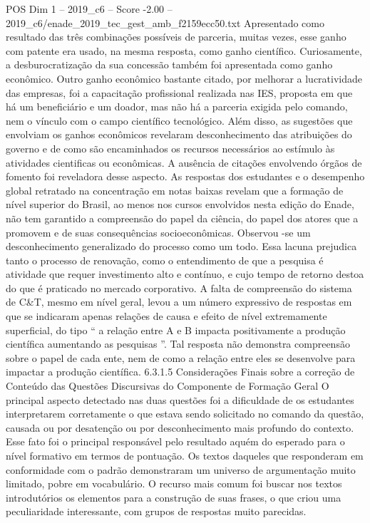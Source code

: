 \begin{textsample}{POS Dim 1 – 2019\_c6 – Score -2.00 – 2019\_c6/enade\_2019\_tec\_gest\_amb\_f2159ecc50.txt}
Apresentado como resultado das três combinações possíveis de parceria, muitas vezes, esse ganho com patente era usado, na mesma resposta, como ganho científico.
Curiosamente, a desburocratização da sua concessão também foi apresentada como ganho econômico.
Outro ganho econômico bastante citado, por melhorar a lucratividade das empresas, foi a capacitação profissional realizada nas IES, proposta em que há um beneficiário e um doador, mas não há a parceria exigida pelo comando, nem o vínculo com o campo científico tecnológico.
Além disso, as sugestões que envolviam os ganhos econômicos revelaram desconhecimento das atribuições do governo e de como são encaminhados os recursos necessários ao estímulo às atividades cientificas ou econômicas.
A ausência de citações envolvendo órgãos de fomento foi reveladora desse aspecto.
As respostas dos estudantes e o desempenho global retratado na concentração em notas baixas revelam que a formação de nível superior do Brasil, ao menos nos cursos envolvidos nesta edição do Enade, não tem garantido a compreensão do papel da ciência, do papel dos atores que a promovem e de suas consequências socioeconômicas.
Observou -se um desconhecimento generalizado do processo como um todo.
Essa lacuna prejudica tanto o processo de renovação, como o entendimento de que a pesquisa é atividade que requer investimento alto e contínuo, e cujo tempo de retorno destoa do que é praticado no mercado corporativo.
A falta de compreensão do sistema de C\&T, mesmo em nível geral, levou a um número expressivo de respostas em que se indicaram apenas relações de causa e efeito de nível extremamente superficial, do tipo “ a relação entre A e B impacta positivamente a produção científica aumentando as pesquisas ”.
Tal resposta não demonstra compreensão sobre o papel de cada ente, nem de como a relação entre eles se desenvolve para impactar a produção científica. 6.3.1.5 Considerações Finais sobre a correção de Conteúdo das Questões Discursivas do Componente de Formação Geral O principal aspecto detectado nas duas questões foi a dificuldade de os estudantes interpretarem corretamente o que estava sendo solicitado no comando da questão, causada ou por desatenção ou por desconhecimento mais profundo do contexto.
Esse fato foi o principal responsável pelo resultado aquém do esperado para o nível formativo em termos de pontuação.
Os textos daqueles que responderam em conformidade com o padrão demonstraram um universo de argumentação muito limitado, pobre em vocabulário.
O recurso mais comum foi buscar nos textos introdutórios os elementos para a construção de suas frases, o que criou uma peculiaridade interessante, com grupos de respostas muito parecidas.

\end{textsample}
